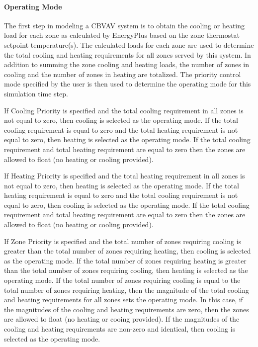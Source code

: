 \paragraph{Operating Mode}\label{operating-mode}

The first step in modeling a CBVAV system is to obtain the cooling or heating load for each zone as calculated by EnergyPlus based on the zone thermostat setpoint temperature(s). The calculated loads for each zone are used to determine the total cooling and heating requirements for all zones served by this system. In addition to summing the zone cooling and heating loads, the number of zones in cooling and the number of zones in heating are totalized. The priority control mode specified by the user is then used to determine the operating mode for this simulation time step.

If Cooling Priority is specified and the total cooling requirement in all zones is not equal to zero, then cooling is selected as the operating mode. If the total cooling requirement is equal to zero and the total heating requirement is not equal to zero, then heating is selected as the operating mode. If the total cooling requirement and total heating requirement are equal to zero then the zones are allowed to float (no heating or cooling provided).

If Heating Priority is specified and the total heating requirement in all zones is not equal to zero, then heating is selected as the operating mode. If the total heating requirement is equal to zero and the total cooling requirement is not equal to zero, then cooling is selected as the operating mode. If the total cooling requirement and total heating requirement are equal to zero then the zones are allowed to float (no heating or cooling provided).

If Zone Priority is specified and the total number of zones requiring cooling is greater than the total number of zones requiring heating, then cooling is selected as the operating mode. If the total number of zones requiring heating is greater than the total number of zones requiring cooling, then heating is selected as the operating mode. If the total number of zones requiring cooling is equal to the total number of zones requiring heating, then the magnitude of the total cooling and heating requirements for all zones sets the operating mode. In this case, if the magnitudes of the cooling and heating requirements are zero, then the zones are allowed to float (no heating or cooing provided). If the magnitudes of the cooling and heating requirements are non-zero and identical, then cooling is selected as the operating mode.

